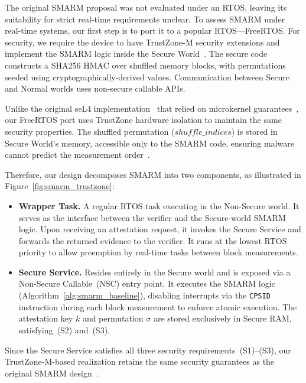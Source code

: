 \documentclass[a4paper,10pt]{article}
\begin{document}
{The original SMARM proposal was not evaluated under an RTOS, leaving its suitability for strict real-time requirements unclear. 
To assess SMARM under real-time systems, our first step is to port it to a popular RTOS—FreeRTOS. 
For security, we require the device to have TrustZone-M security extensions and implement the SMARM logic  inside the Secure World~\cite{trustzone2025}. 
The secure code constructs a SHA256 HMAC over shuffled memory blocks, with permutations seeded using cryptographically-derived values.
Communication between Secure and Normal worlds uses non-secure callable APIs. 

Unlike the original seL4 implementation~\cite{eldefrawy2017hydra} that relied on microkernel guarantees~\cite{klein2009sel4}, our FreeRTOS port uses TrustZone hardware isolation to maintain the same security properties. 
The shuffled permutation ($shuffle\_indices$) is stored in Secure World's memory, accessible only to the SMARM code, ensuring malware cannot predict the measurement order~\cite{carpent2018smarm}.


Therefore, our design decomposes SMARM into two components, as illustrated in Figure~\ref{fig:smarm_trustzone}:

\begin{itemize}
    \item \textbf{Wrapper Task.} A regular RTOS task executing in the Non-Secure 
    world. It serves as the interface between the verifier and the Secure-world SMARM 
    logic. Upon receiving an attestation request, it invokes the Secure Service and 
    forwards the returned evidence to the verifier. It runs at the lowest RTOS priority 
    to allow preemption by real-time tasks between block measurements.

    \item \textbf{Secure Service.} Resides entirely in the Secure world and is exposed 
    via a Non-Secure Callable~(NSC) entry point. It executes the SMARM logic 
    (Algorithm~\ref{alg:smarm_baseline}), disabling interrupts via the \texttt{CPSID} 
    instruction during each block measurement to enforce atomic execution. The 
    attestation key $k$ and permutation $\sigma$ are stored exclusively in Secure RAM, 
    satisfying~(S2) and~(S3).
\end{itemize}

Since the Secure Service satisfies all three security requirements~(S1)--(S3), our 
TrustZone-M-based realization retains the same security guarantees as the original 
SMARM design~\cite{carpent2018smarm}.

}
\end{document}
